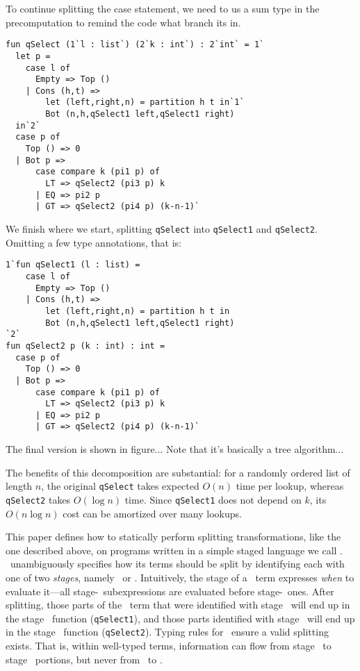To continue splitting the case statement, we need to us a sum type in the precomputation
to remind the code what branch its in.

\begin{lstlisting} 
fun qSelect (1`l : list`) (2`k : int`) : 2`int` = 1`
  let p = 
    case l of
      Empty => Top ()
    | Cons (h,t) =>
        let (left,right,n) = partition h t in`1`
        Bot (n,h,qSelect1 left,qSelect1 right)
  in`2`
  case p of 
    Top () => 0
  | Bot p => 
      case compare k (pi1 p) of
        LT => qSelect2 (pi3 p) k
      | EQ => pi2 p
      | GT => qSelect2 (pi4 p) (k-n-1)`
\end{lstlisting}

We finish where we start, splitting \texttt{qSelect} into
\texttt{qSelect1} and \texttt{qSelect2}.  
Omitting a few type annotations, that is:

\begin{lstlisting} 
1`fun qSelect1 (l : list) = 
    case l of
      Empty => Top ()
    | Cons (h,t) =>
        let (left,right,n) = partition h t in
        Bot (n,h,qSelect1 left,qSelect1 right)
`2`
fun qSelect2 p (k : int) : int = 
  case p of 
    Top () => 0
  | Bot p => 
      case compare k (pi1 p) of
        LT => qSelect2 (pi3 p) k
      | EQ => pi2 p
      | GT => qSelect2 (pi4 p) (k-n-1)`
\end{lstlisting}

The final version is shown in figure...
Note that it's basically a tree algorithm...

The benefits of this decomposition are substantial: for a randomly ordered list of length $n$, 
the original \texttt{qSelect} takes expected $O(n)$ time per lookup, 
whereas \texttt{qSelect2} takes $O(\log n)$ time.
Since \texttt{qSelect1} does not depend on $k$, its $O(n\log n)$ cost can be amortized over many lookups.

This paper defines how to statically perform splitting transformations, like the one described above, on programs written in a simple staged language we call \lang.  \lang\ unambiguously specifies how its terms should be split
by identifying each with one of two {\em stages}, namely \bbone\ or \bbtwo.
Intuitively, the stage of a \lang\ term expresses \emph{when} to evaluate it---all stage-\bbone\
subexpressions are evaluated before stage-\bbtwo\ ones.  
After splitting, those parts of the \lang\ term that were identified with stage \bbone\ 
will end up in the stage \bbone\ function ({\tt qSelect1}), 
and those parts identified with stage \bbtwo\ will end up in the stage \bbtwo\ function ({\tt qSelect2}).
Typing rules for \lang\ ensure a valid splitting exists.  That is, 
within well-typed terms, information can flow from stage \bbone\ to stage \bbtwo\ portions,
but never from \bbtwo\ to \bbone.


